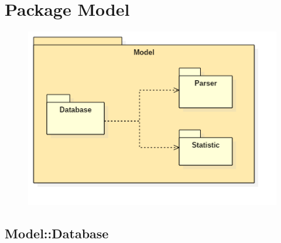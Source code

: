 \section{Package Model}\begin{figure}[h!]
\begin{center}
	\includegraphics[scale=0.7]{../images/ModelPackage.png}
\end{center}
\end{figure}
\subsection{Model::Database}
